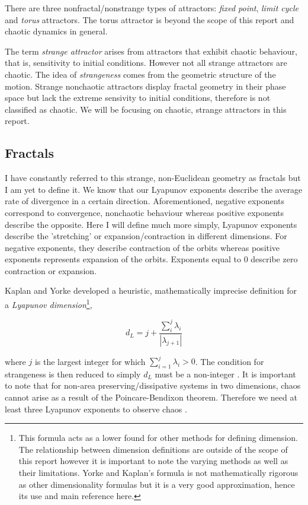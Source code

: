 \documentclass[aps,prl,reprint,10pt,amsmath,amssymb,superscriptaddress,a4paper]{revtex4-2}
\begin{document}
There are three nonfractal/nonstrange types of attractors: \textit{fixed point}, \textit{limit cycle} and \textit{torus} attractors. The torus attractor is beyond the scope of this report
and chaotic dynamics in general. 

The term \textit{strange attractor} arises from attractors that exhibit chaotic behaviour, that is, sensitivity to initial conditions. However not all strange attractors are chaotic. The 
idea of \textit{strangeness} comes from the geometric structure of the motion. Strange nonchaotic attractors display fractal geometry in their phase space but lack the extreme sensivity 
to initial conditions, therefore is not classified as chaotic. We will be focusing on chaotic, strange attractors in this report.

\subsection{Fractals}

I have constantly referred to this strange, non-Euclidean geometry as fractals but I am yet to define it. We know that our Lyapunov exponents describe the average rate of divergence in a 
certain direction. Aforementioned, negative exponents correspond to convergence, nonchaotic behaviour whereas positive exponents describe the opposite. Here I will define much more simply, 
Lyapunov exponents describe the 'stretching' or expansion/contraction in different dimensions. For negative exponents, they describe contraction of the orbits whereas positive exponents 
represents expansion of the orbits. Exponents equal to 0 describe zero contraction or expansion.

Kaplan and Yorke \citep{kaplan} developed a heuristic, mathematically imprecise definition for a \textit{Lyapunov dimension}\footnote{This formula acts as a lower found for other methods for 
defining dimension. The relationship between dimension definitions are outside of the scope of this report however it is important to note the varying methods as well as their limitations. Yorke 
and Kaplan's formula is not mathematically rigorous as other dimensionality formulas but it is a very good approximation, hence its use and main reference here.},

\begin{equation}
    d_L = j + \frac{\sum_{i}^{j}\lambda_i}{\left|\lambda_{j+1}\right|}
\end{equation}

where $j$ is the largest integer for which $\sum_{i=1}^{j}\lambda_i > 0$. The condition for strangeness is then reduced to simply $d_L$ must be a non-integer \citep{taylor}. It is important 
to note that for non-area preserving/dissipative systems in two dimensions, chaos cannot arise as a result of the Poincare-Bendixon theorem. Therefore we need at least three Lyapunov exponents 
to observe chaos \citep{Bendixson1901}.
\end{document}
